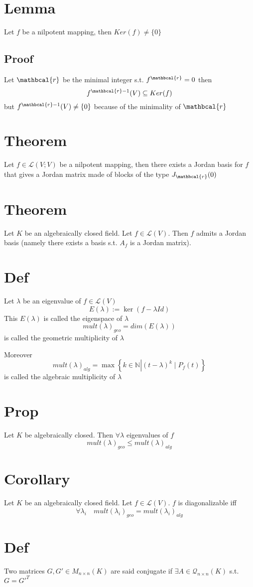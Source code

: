 \documentclass{article}
\begin{document}
\section{Lemma}
Let $f$ be a nilpotent mapping, then $Ker (f)\neq\{0\}$
\subsection*{Proof}
Let $\mathbcal{r}$ be the minimal integer s.t. $f^\mathbcal{r}=0$ then
$$f^{\mathbcal{r}-1}(V)\subseteq Ker(f)$$
but $f^{\mathbcal{r}-1}(V)\neq\{0\}$ because of the minimality of $\mathbcal{r}$
\section{Theorem}
Let $f\in\mathscr{L}(V;V)$ be a nilpotent mapping, then there exists a Jordan basis for $f$ that gives a Jordan matrix made of blocks of the type $J_\mathbcal{r}(0)$
\section{Theorem}
Let $K$ be an algebraically closed field. Let $f\in \mathscr{L}(V)$. Then  $f$ admits a Jordan basis (namely there exists a basis s.t. $A_f$ is a Jordan matrix). 
\section{Def}
Let $\lambda$ be an eigenvalue of $f\in \mathscr{L}(V)$
$$E(\lambda):=\ker (f-\lambda Id)$$
This $E(\lambda)$ is called the eigenspace of $\lambda$
$$mult(\lambda)_{geo}=dim(E(\lambda))$$
is called the geometric multiplicity of $\lambda$

Moreover
$$mult(\lambda)_{alg}=\max\left\{k\in \mathbb{N}\left| (t-\lambda)^k\mid P_f(t)\right.\right\}$$
is called the algebraic multiplicity of $\lambda$
\section{Prop}
Let $K$ be algebraically closed. Then $\forall \lambda$ eigenvalues of $f$
$$mult(\lambda)_{geo}\leq mult(\lambda)_{alg}$$
\section{Corollary}
Let $K$ be an algebraically closed field. Let $f\in \mathscr{L}(V)$. $f$ is diagonalizable iff $$\forall\lambda_i\quad mult(\lambda_i)_{geo}=mult(\lambda_i)_{alg}$$
\section{Def}Two matrices $G,G'\in M_{n\times n}(K)$ are said conjugate if $\exists A\in \mathcal{Q}_{n\times n}(K)$ s.t. $G=G'^T$
\end{document}
